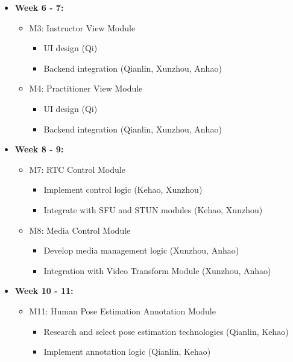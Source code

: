 \documentclass[12pt, titlepage]{article}
\begin{document}
\begin{itemize}
\begin{itemize}
\begin{itemize}
      \end{itemize}
  \end{itemize}
  \item \textbf{Week 6 - 7:}
  \begin{itemize}
      \item M3: Instructor View Module
      \begin{itemize}
          \item UI design (Qi)
          \item Backend integration (Qianlin, Xunzhou, Anhao)
      \end{itemize}
      \item M4: Practitioner View Module
      \begin{itemize}
          \item UI design (Qi)
          \item Backend integration (Qianlin, Xunzhou, Anhao)
      \end{itemize}
  \end{itemize}
  \item \textbf{Week 8 - 9:}
  \begin{itemize}
      \item M7: RTC Control Module
      \begin{itemize}
          \item Implement control logic (Kehao, Xunzhou)
          \item Integrate with SFU and STUN modules (Kehao, Xunzhou)
      \end{itemize}
      \item M8: Media Control Module
      \begin{itemize}
          \item Develop media management logic (Xunzhou, Anhao)
          \item Integration with Video Transform Module (Xunzhou, Anhao)
      \end{itemize}
  \end{itemize}
  \item \textbf{Week 10 - 11:}
  \begin{itemize}
      \item M11: Human Pose Estimation Annotation Module
      \begin{itemize}
          \item Research and select pose estimation technologies (Qianlin, Kehao)
          \item Implement annotation logic (Qianlin, Kehao)
      \end{itemize}

\end{itemize}
\end{itemize}
\end{document}
